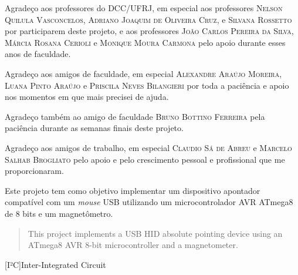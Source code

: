 \documentclass[brazil,pagestart=firstchapter]{abnt}
\begin{document}

Agradeço aos professores do DCC/UFRJ, em especial aos professores
\textsc{Nelson Quilula Vasconcelos},
\textsc{Adriano Joaquim de Oliveira Cruz}, e
\textsc{Silvana Rossetto} por participarem deste projeto,
e aos professores
\textsc{João Carlos Pereira da Silva},
\textsc{Márcia Rosana Cerioli} e
\textsc{Monique Moura Carmona} pelo apoio durante esses anos de faculdade.

Agradeço aos amigos de faculdade, em especial
\textsc{Alexandre Araújo Moreira},
\textsc{Luana Pinto Araújo} e
\textsc{Priscila Neves Bilangieri} por toda a paciência e apoio nos
momentos em que mais precisei de ajuda.

Agradeço também ao amigo de faculdade
\textsc{Bruno Bottino Ferreira} pela paciência durante as semanas finais
deste projeto.

Agradeço aos amigos de trabalho, em especial
\textsc{Claudio Sá de Abreu} e
\textsc{Marcelo Salhab Brogliato} pelo apoio e pelo crescimento pessoal e
profissional que me proporcionaram.


\begin{resumo}
Este projeto tem como objetivo implementar um dispositivo apontador
compatível com um \textit{mouse} USB utilizando um microcontrolador AVR
ATmega8 de 8 bits e um magnetômetro.
\end{resumo}

\begin{abstract}
This project implements a USB HID absolute pointing device using an ATmega8
AVR 8-bit microcontroller and a magnetometer.
\end{abstract}


\listoffigures





\begin{acronym}[EEPROM]

[I²C]{Inter-Integrated Circuit}

\end{acronym}
\end{document}
